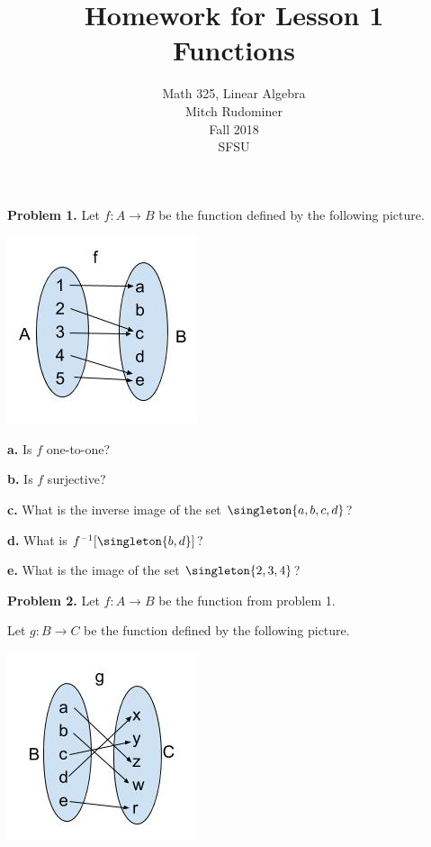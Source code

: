 \documentclass[oneside,12pt]{amsart}
\begin{document}
\title{Homework for Lesson 1 \\ Functions}
\author{Math 325, Linear Algebra \\ Mitch Rudominer \\ Fall 2018 \\ SFSU }
\date{}

\maketitle


\textbf{Problem 1.} Let $f:A\to B$ be the function defined by the following
picture.

\includegraphics[scale=0.25]{hw_function1}

\textbf{a.} Is $f$ one-to-one?

\smallskip

\textbf{b.} Is $f$ surjective?

\smallskip

\textbf{c.} What is the inverse image of the set $\singleton{a,b,c,d}$?

\medskip

\textbf{d.} What is $f^{-1}[\singleton{b, d}]$?

\medskip

\textbf{e.} What is the image of the set $\singleton{2,3,4}$?

\bigskip

\textbf{Problem 2.} Let $f:A\to B$ be the function from problem 1.

Let $g:B\to C$ be the function defined by the following
picture.

\includegraphics[scale=0.25]{hw_function2}
\end{document}
